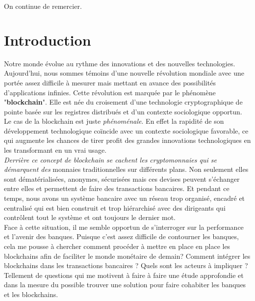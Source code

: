\documentclass[12pt]{report}
\begin{document}
\hspace{1cm} On continue de remercier.\\ 


\newpage
\renewcommand{\contentsname}{Table des matières}
\tableofcontents
\pagebreak


\section{Introduction}
\hspace{1cm} Notre monde évolue au rythme des innovations et des nouvelles technologies. Aujourd'hui, nous sommes témoins d'une nouvelle révolution mondiale avec une portée assez difficile à mesurer mais mettant en avance des possibilités d'applications infinies. Cette révolution est marquée par le phénomène "\textbf{blockchain}". Elle est née du croisement d'une technologie cryptographique de pointe basée sur les registres distribués et d'un contexte sociologique opportun. Le cas de la blockchain est juste \textit{phénoménale}. En effet la rapidité de son développement technologique coïncide avec un contexte sociologique favorable, ce qui augmente les chances de tirer profit des grandes innovations technologiques en les transformant en un vrai usage. \\

\hspace{1cm} \textit{Derrière ce concept de blockchain se cachent les cryptomonnaies qui se démarquent des} monnaies traditionnelles sur différents plans. Non seulement elles sont dématérialisées, anonymes, sécurisées mais ces devises peuvent s'échanger entre elles et permettent de faire des transactions bancaires. Et pendant ce temps, nous avons un système bancaire avec un réseau trop organisé, encadré et centralisé qui est bien construit et trop hiérarchisé avec des dirigeants qui contrôlent tout le système et ont toujours le dernier mot.\\

\hspace{1cm} Face à cette situation, il me semble opportun de s'interroger sur la performance et l'avenir des banques. Puisque c'est assez difficile de contourner les banques, cela me pousse à chercher comment procéder à mettre en place en place les blockchains afin de faciliter le monde monétaire de demain? Comment intégrer les blockchains dans les transactions bancaires ? Quels sont les acteurs à impliquer ? Tellement de questions qui me motivent à faire à faire une étude approfondie et dans la mesure du possible trouver une solution pour faire cohabiter les banques et les blockchains.\\
\end{document}
